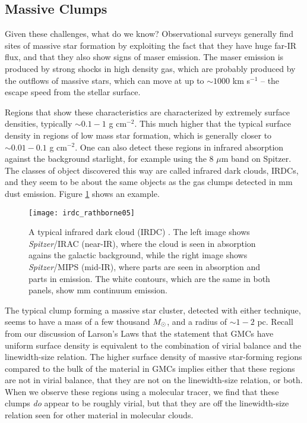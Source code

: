 \subsection{Massive Clumps}

Given these challenges, what do we know? Observational surveys generally find sites of massive star formation by exploiting the fact that they have huge far-IR flux, and that they also show signs of maser emission. The maser emission is produced by strong shocks in high density gas, which are probably produced by the outflows of massive stars, which can move at up to $\sim 1000$ km s$^{-1}$ -- the escape speed from the stellar surface.

Regions that show these characteristics are characterized by extremely surface densities, typically $\sim 0.1-1$ g cm$^{-2}$.
This much higher that the typical surface density in regions of low mass star formation, which is generally closer to $\sim 0.01 - 0.1$ g cm$^{-2}$. One can also detect these regions in infrared absorption against the background starlight, for example using the 8 $\mu$m band on Spitzer. The classes of object discovered this way are called infrared dark clouds, IRDCs, and they seem to be about the same objects as the gas clumps detected in mm dust emission. Figure \ref{fig:irdc_rathborne05} shows an example.

\begin{figure}
\texttt{[image: irdc\_rathborne05]}
\caption[IR and mm images of an IRDC]{
\label{fig:irdc_rathborne05}
A typical infrared dark cloud (IRDC) \citep{rathborne06a}. The left image shows \textit{Spitzer}/IRAC (near-IR), where the cloud is seen in absorption agains the galactic background, while the right image shows \textit{Spitzer}/MIPS (mid-IR), where parts are seen in absorption and parts in emission. The white contours, which are the same in both panels, show mm continuum emission.
}
\end{figure}

The typical clump forming a massive star cluster, detected with either technique, seems to have a mass of a few thousand $M_{\odot}$, and a radius of $\sim 1-2$ pc. Recall from our discussion of Larson's Laws that the statement that GMCs have uniform surface density is equivalent to the combination of virial balance and the linewidth-size relation. The higher surface density of massive star-forming regions compared to the bulk of the material in GMCs implies either that these regions are not in virial balance, that they are not on the linewidth-size relation, or both. When we observe these regions using a molecular tracer, we find that these clumps {\it do} appear to be roughly virial, but that they are off the linewidth-size relation seen for other material in molecular clouds.

